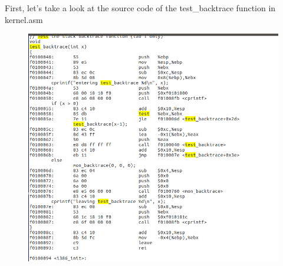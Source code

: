 First, let's take a look at the source code of the test\_backtrace function in kernel.asm
\begin{figure}[H]
  \centering
  \includegraphics[width=0.8\linewidth]{figure/test_backtrace}
\end{figure}

